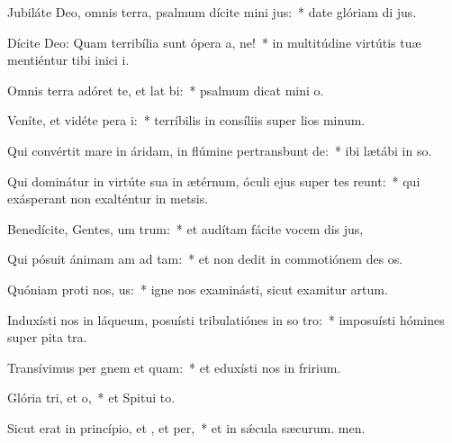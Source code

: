 \item Jubiláte Deo, omnis terra, psalmum dícite mini jus:~* date glóriam di jus.
\item Dícite Deo: Quam terribília sunt ópera a, ne!~* in multitúdine virtútis tuæ mentiéntur tibi inici i.
\item Omnis terra adóret te, et lat bi:~* psalmum dicat mini o.
\item Veníte, et vidéte pera i:~* terríbilis in consíliis super lios minum.
\item Qui convértit mare in áridam, in flúmine pertransbunt de:~* ibi lætábi in so.
\item Qui dominátur in virtúte sua in ætérnum, óculi ejus super tes reunt:~* qui exásperant non exalténtur in metsis.
\item Benedícite, Gentes, um trum:~* et audítam fácite vocem dis jus,
\item Qui pósuit ánimam am ad tam:~* et non dedit in commotiónem des os.
\item Quóniam proti nos, us:~* igne nos examinásti, sicut examitur artum.
\item Induxísti nos in láqueum, posuísti tribulatiónes in so tro:~* imposuísti hómines super pita tra.
\item Transívimus per gnem et quam:~* et eduxísti nos in fririum.
\item Glória tri, et o,~* et Spitui to.
\item Sicut erat in princípio, et , et per,~* et in sǽcula sæcurum. men.
